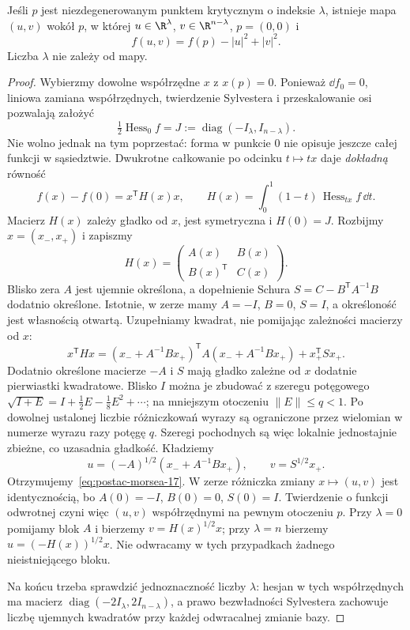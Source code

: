 \begin{twierdzenie}
\label{thm:lemat-morsea-17}
Jeśli $p$ jest niezdegenerowanym punktem
krytycznym o indeksie $\lambda$, istnieje
mapa $(u,v)$ wokół $p$, w której
$u\in\R^\lambda$, $v\in\R^{n-\lambda}$,
$p=(0,0)$ i
\begin{equation}\label{eq:postac-morsea-17}
 f(u,v)=f(p)-|u|^2+|v|^2.
\end{equation}
Liczba $\lambda$ nie zależy od mapy.
\end{twierdzenie}
\begin{proof}
Wybierzmy dowolne współrzędne $x$ z $x(p)=0$.
Ponieważ $\dd f_0=0$, liniowa zamiana
współrzędnych, twierdzenie Sylvestera
i przeskalowanie osi pozwalają założyć
\[
 \tfrac12\operatorname{Hess}_0f
  =J:=\operatorname{diag}(-I_\lambda,I_{n-\lambda}).
\]
Nie wolno jednak na tym poprzestać:
forma w punkcie $0$ nie opisuje jeszcze
całej funkcji w sąsiedztwie.
Dwukrotne całkowanie po odcinku
$t\mapsto tx$ daje \emph{dokładną} równość
\[
 f(x)-f(0)
  =x^{\mathsf T}H(x)x,\qquad
 H(x)=\int_0^1(1-t)\,
                    \operatorname{Hess}_{tx}f\,\dd t.
\]
Macierz $H(x)$ zależy gładko od $x$,
jest symetryczna i $H(0)=J$.
Rozbijmy $x=(x_-,x_+)$ i zapiszmy
\[
 H(x)=
 \begin{pmatrix} A(x)&B(x)\\
                 B(x)^{\mathsf T}&C(x)\end{pmatrix}.
\]
Blisko zera $A$ jest ujemnie określona,
a dopełnienie Schura
$S=C-B^{\mathsf T}A^{-1}B$ dodatnio
określone. Istotnie, w zerze mamy
$A=-I$, $B=0$, $S=I$, a określoność
jest własnością otwartą.
Uzupełniamy kwadrat, nie pomijając
zależności macierzy od $x$:
\[
 x^{\mathsf T}Hx
 =(x_-+A^{-1}Bx_+)^{\mathsf T}
       A(x_-+A^{-1}Bx_+)
   +x_+^{\mathsf T}Sx_+.
\]
Dodatnio określone macierze $-A$ i $S$
mają gładko zależne od $x$ dodatnie
pierwiastki kwadratowe. Blisko $I$
można je zbudować z szeregu potęgowego
$\sqrt{I+E}
 =I+\tfrac12E-\tfrac18E^2+\cdots$;
na mniejszym otoczeniu $\|E\|\leq q<1$.
Po dowolnej ustalonej liczbie różniczkowań
wyrazy są ograniczone przez wielomian
w numerze wyrazu razy potęgę $q$.
Szeregi pochodnych są więc lokalnie
jednostajnie zbieżne, co uzasadnia gładkość. Kładziemy
\[
 u=(-A)^{1/2}(x_-+A^{-1}Bx_+),
 \qquad v=S^{1/2}x_+.
\]
Otrzymujemy~\eqref{eq:postac-morsea-17}.
W zerze różniczka zmiany
$x\mapsto(u,v)$ jest identycznością,
bo $A(0)=-I$, $B(0)=0$, $S(0)=I$.
Twierdzenie o funkcji odwrotnej
czyni więc $(u,v)$ współrzędnymi
na pewnym otoczeniu $p$.
Przy $\lambda=0$ pomijamy blok $A$ i bierzemy
$v=H(x)^{1/2}x$; przy $\lambda=n$ bierzemy
$u=(-H(x))^{1/2}x$. Nie odwracamy w tych
przypadkach żadnego nieistniejącego bloku.

Na końcu trzeba sprawdzić jednoznaczność
liczby $\lambda$: hesjan w tych
współrzędnych ma macierz
$\operatorname{diag}(-2I_\lambda,2I_{n-\lambda})$,
a prawo bezwładności Sylvestera
zachowuje liczbę ujemnych kwadratów
przy każdej odwracalnej zmianie bazy.
\end{proof}

